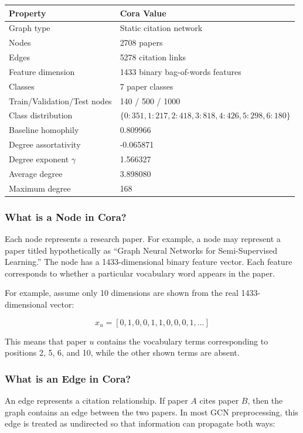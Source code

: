 \documentclass[12pt,a4paper]{article}
\begin{document}
\begin{longtable}{p{2.3in}p{3.5in}}
\toprule
\textbf{Property} & \textbf{Cora Value}\\
\midrule
Graph type & Static citation network\\
Nodes & 2708 papers\\
Edges & 5278 citation links\\
Feature dimension & 1433 binary bag-of-words features\\
Classes & 7 paper classes\\
Train/Validation/Test nodes & 140 / 500 / 1000\\
Class distribution & $\{0:351,1:217,2:418,3:818,4:426,5:298,6:180\}$\\
Baseline homophily & 0.809966\\
Degree assortativity & -0.065871\\
Degree exponent $\gamma$ & 1.566327\\
Average degree & 3.898080\\
Maximum degree & 168\\
\bottomrule
\end{longtable}

\subsubsection{What is a Node in Cora?}
Each node represents a research paper. For example, a node may represent a paper titled hypothetically as ``Graph Neural Networks for Semi-Supervised Learning.'' The node has a 1433-dimensional binary feature vector. Each feature corresponds to whether a particular vocabulary word appears in the paper.

For example, assume only 10 dimensions are shown from the real 1433-dimensional vector:

$$
x_u = [0,1,0,0,1,1,0,0,0,1,\ldots]
$$

This means that paper $u$ contains the vocabulary terms corresponding to positions 2, 5, 6, and 10, while the other shown terms are absent.

\subsubsection{What is an Edge in Cora?}
An edge represents a citation relationship. If paper $A$ cites paper $B$, then the graph contains an edge between the two papers. In most GCN preprocessing, this edge is treated as undirected so that information can propagate both ways:
\end{document}
